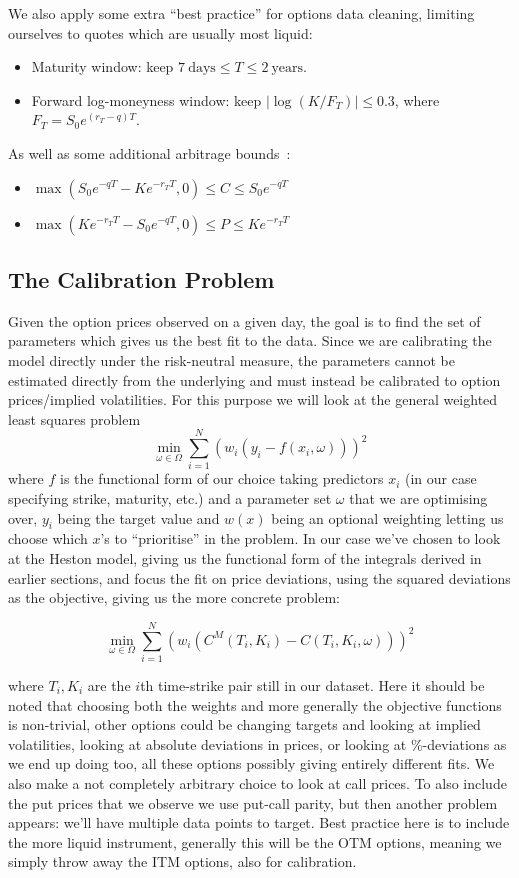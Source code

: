 We also apply some extra ``best practice'' for options data cleaning, limiting ourselves to quotes which are usually most liquid:
\begin{itemize}
  \item Maturity window: keep $7~\text{days} \le T \le 2~\text{years}$.
  \item Forward log-moneyness window: keep $|\log(K/F_T)| \le 0.3$, where $F_T = S_0 e^{(r_T-q)T}$.
\end{itemize} 
As well as some additional arbitrage bounds~\cite{ContagiousMarkets}:
\begin{itemize}
  \item $\max(S_0 e^{-qT} - K e^{-r_T T}, 0) \le C \le S_0 e^{-qT}$
  \item   $\max(K e^{-r_T T} - S_0 e^{-qT}, 0) \le P \le K e^{-r_T T}$
\end{itemize}

\subsection{The Calibration Problem}
Given the option prices observed on a given day, the goal is to find the set of parameters which gives us the best fit to the data.
Since we are calibrating the model directly under the risk-neutral measure, the parameters cannot be estimated directly from the
underlying and must instead be calibrated to option prices/implied volatilities. For this purpose we will look at the general weighted least squares problem
$$\min_{\omega \in \Omega} \sum_{i=1}^{N}(w_i(y_i-f(x_i,\omega)))^2
$$
where $f$ is the functional form of our choice taking predictors $x_i$ (in our case specifying strike, maturity, etc.) and a parameter set $\omega$ that we are optimising over, $y_i$ being the target value and
$w(x)$ being an optional weighting letting us choose which $x$'s to ``prioritise'' in the problem. In our case we've chosen to look at the Heston model, giving us the functional form of the integrals derived
in earlier sections, and focus the fit on price deviations, using the squared deviations as the objective, giving us the more concrete problem:

$$\min_{\omega \in \Omega} \sum_{i=1}^{N}(w_i(C^M(T_i,K_i)-C(T_i,K_i,\omega)))^2
$$

where $T_i,K_i$ are the $i$th time-strike pair still in our dataset.
Here it should be noted that choosing both the weights and more generally the objective functions is non-trivial, other options
could be changing targets and looking at implied volatilities, looking at absolute deviations in prices, or looking at \%-deviations as we end up doing too, all these options possibly giving entirely different fits.
We also make a not completely arbitrary choice to look at call prices. To also include the put prices that we observe we use put-call parity, but then another problem appears: we'll have multiple data points to target.
Best practice here is to include the more liquid instrument, generally this will be the OTM options, meaning we simply throw away the ITM options, also for calibration.



